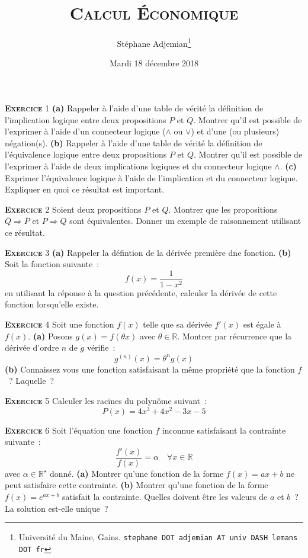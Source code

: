 \documentclass[10pt,a4paper,notitlepage,twocolumn]{article}
\newcommand{\exercise}[1]{\textsc{\textbf{Exercice}} #1}
\newcommand{\question}[1]{\textbf{(#1)}}
\begin{document}
\title{\textsc{Calcul Économique}}
\author{Stéphane Adjemian\thanks{Université du Maine, Gains. \texttt{stephane DOT adjemian AT univ DASH lemans DOT fr}}}
\date{Mardi 18 décembre 2018}

\maketitle
\thispagestyle{empty}

\exercise{1} \question{a} Rappeler à l'aide d'une table de vérité la
définition de l'implication logique entre deux propositions $P$ et
$Q$. Montrer qu'il est possible de l'exprimer à l'aide d'un connecteur
logique ($\land$ ou $\lor$) et d'une (ou plusieurs)
négation(s). \question{b} Rappeler à l'aide d'une table de vérité la
définition de l'équivalence logique entre deux propositions $P$ et
$Q$. Montrer qu'il est possible de l'exprimer à l'aide de deux
implications logiques et du connecteur logique $\land$. \question{c}
Exprimer l'équivalence logique à l'aide de l'implication et du
connecteur logique. Expliquer en quoi ce résultat est important.

\bigskip
  
\exercise{2} Soient deux propositions $P$ et $Q$. Montrer que les
propositions $\bar Q \Rightarrow \bar P$ et $P \Rightarrow Q$ sont
équivalentes. Donner un exemple de raisonnement utilisant ce résultat.

\bigskip

\exercise{3} \question{a} Rappeler la défintion de la dérivée première
dne fonction. \question{b} Soit la fonction suivante :
\[
f(x) = \frac{1}{1-x^2}
\]
en utilisant la réponse à la question précédente, calculer la dérivée
de cette fonction lorsqu'elle existe.

\bigskip

\exercise{4} Soit une fonction $f(x)$ telle que sa dérivée $f'(x)$ est
égale à $f(x)$. \question{a} Posons $g(x) = f(\theta x)$ avec
$\theta\in\mathbb R$. Montrer par récurrence que la dérivée d'ordre
$n$ de $g$ vérifie :
\[
g^{(n)}(x) = \theta^{n}g(x)
\]
\question{b} Connaissez vous une fonction satisfaisant la même
propriété que la fonction $f$ ? Laquelle ?

\bigskip

\exercise{5} Calculer les racines du polynôme suivant : 
\[
P(x) = 4x^3+4x^2-3x-5
\]

\bigskip

\exercise{6} Soit l'équation une fonction $f$ inconnue satisfaisant la contrainte suivante :
\[
\frac{f'(x)}{f(x)} = \alpha\quad \forall x\in \mathbb R
\]
avec $\alpha\in\mathbb R^{\star}$ donné. \question{a} Montrer qu'une
fonction de la forme $f(x) = ax+b$ ne peut satisfaire cette
contrainte. \question{b} Montrer qu'une fonction de la forme
$f(x)=e^{ax+b}$ satisfait la contrainte. Quelles doivent être les valeurs de
$a$ et $b$ ? La solution est-elle unique ?
\end{document}
